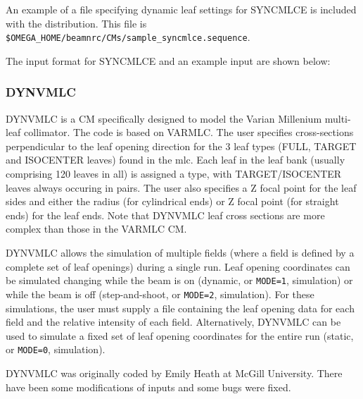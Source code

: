 \documentclass[12pt,twoside]{article}
\begin{document}
An example of a file specifying dynamic leaf settings for SYNCMLCE
is included with the distribution.  This file is {\tt \$OMEGA\_HOME/beamnrc/CMs/sample\_syncmlce.sequence}.

The input format for SYNCMLCE and an example input are shown below:
\begin{small}

\end{small}


\clearpage

\renewcommand{\rightmark}{DYNVMLC CM}
\subsubsection{DYNVMLC}
\label{dynvmlcsect}
DYNVMLC is a CM specifically designed to model the Varian Millenium
multi-leaf collimator.  The code is based on VARMLC.  The user specifies
cross-sections perpendicular to the leaf opening direction for the 3 leaf
types (FULL, TARGET and ISOCENTER leaves) found in the mlc.  Each leaf
in the leaf bank (usually comprising 120 leaves in all) is assigned
a type, with TARGET/ISOCENTER leaves always occuring in pairs.  The user
also specifies a Z focal point for
the leaf sides and either the radius (for cylindrical ends) or Z focal point
(for straight ends)
for the leaf ends. Note that DYNVMLC leaf cross sections are more complex than those in the
VARMLC CM.

DYNVMLC allows the simulation of multiple fields
(where a field is defined by a complete set of leaf openings)
during a single run.  Leaf opening coordinates can be simulated changing
while the beam is on (dynamic, or {\tt MODE=1}, simulation) or while
the beam is off (step-and-shoot, or {\tt MODE=2}, simulation).
For these simulations, the user must supply a file
containing the leaf opening data for each field
and the relative intensity of each field.  Alternatively, DYNVMLC can be
used to simulate a fixed set of leaf opening coordinates for the
entire run (static, or {\tt MODE=0}, simulation).

DYNVMLC was originally coded by Emily Heath at McGill University.
There have been some modifications of inputs and some bugs were
fixed.
\end{document}
